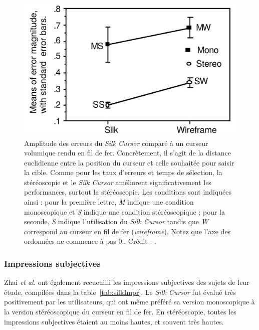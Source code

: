 	\begin{figure}[ht]
		\centering
		\includegraphics[width=\textwidth]{figures/ch2/silkErrorMag}
		\caption[Amplitude des erreurs du \emph{Silk Cursor}]{Amplitude des erreurs du \emph{Silk Cursor} comparé à un curseur volumique rendu en fil de fer. Concrètement, il s'agit de la distance euclidienne entre la position du curseur et celle souhaitée pour saisir la cible. Comme pour les taux d'erreurs et temps de sélection, la stéréoscopie et le \emph{Silk Cursor} améliorent significativement les performances, surtout la stéréoscopie. Les conditions sont indiquées ainsi : pour la première lettre, \emph{M} indique une condition monoscopique et \emph{S} indique une condition stéréoscopique ; pour la seconde, \emph{S} indique l'utilisation du \emph{Silk Cursor} tandis que \emph{W} correspond au curseur en fil de fer (\emph{wireframe}). Notez que l'axe des ordonnées ne commence à pas $0$.. Crédit : \cite{zhai1994silk}.}
		\label{fig:silkErrorMag}
	\end{figure}
	
	\subsubsection{Impressions subjectives}
	Zhai \emph{et al.} ont également recueuilli les impressions subjectives des sujets de leur étude, compilées dans la table~\ref{tab:silkImpr}. Le \emph{Silk Cursor} fut évalué très positivement par les utilisateurs, qui ont même préféré sa version monoscopique à la version stéréoscopique du curseur en fil de fer. En stéréoscopie, toutes les impressions subjectives étaient au moins hautes, et souvent très hautes.

